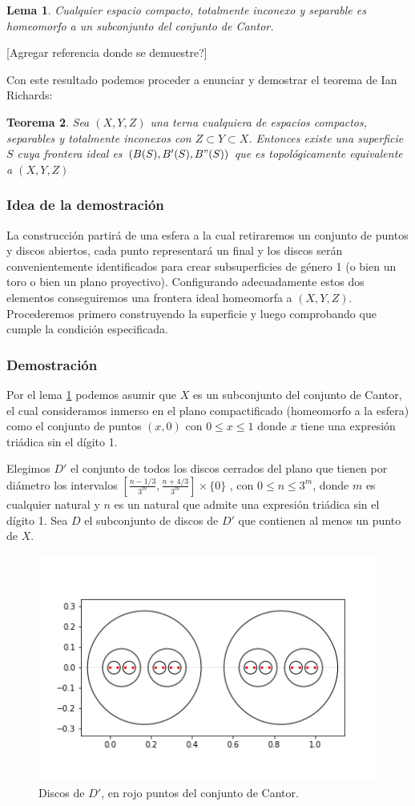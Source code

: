 \documentclass[a4paper,11pt,spanish, twoside, leqno]{tfg-uam}
\newtheorem{teor}{Teorema}[chapter]
\newtheorem{lema}[teor]{Lema}
\theoremstyle{definition}
\begin{document}
\begin{lema}
\label{lema:cantor}
Cualquier espacio compacto, totalmente inconexo y separable es homeomorfo a un subconjunto del conjunto de Cantor.
\end{lema}
[Agregar referencia donde se demuestre?]

Con este resultado podemos proceder a enunciar y demostrar el teorema de Ian Richards:

\begin{teor}
Sea $(X,Y,Z)$ una terna cualquiera de espacios compactos, separables y totalmente inconexos con $Z \subset Y \subset X$.  Entonces existe una superficie $S$ cuya frontera ideal es $(B(S), B'(S), B"(S))$ que es topológicamente equivalente a $(X,Y,Z)$
\end{teor}

\subsubsection*{Idea de la demostración}
La construcción partirá de una esfera a la cual retiraremos un conjunto de puntos y discos abiertos, cada punto representará un final y los discos serán convenientemente identificados para crear  subsuperficies de género 1 (o bien un toro o bien un plano proyectivo). Configurando adecuadamente estos dos elementos conseguiremos una frontera ideal homeomorfa a $(X,Y,Z)$.\\
Procederemos primero construyendo la superficie y luego comprobando que cumple la condición especificada.


\subsubsection*{Demostración}
Por el lema \ref{lema:cantor} podemos asumir que $X$ es un subconjunto del conjunto de Cantor, el cual consideramos inmerso en el plano compactificado (homeomorfo a la esfera) como el conjunto de puntos $(x,0)$ con $0 \leq x\leq 1$ donde $x$ tiene una expresión triádica sin el dígito 1.


Elegimos $D'$ el conjunto de todos los discos cerrados del plano que tienen por diámetro los intervalos $[\frac{n - 1/3}{3^m} , \frac{n + 4/3}{3^m} ] \times \{0\}$ , con $0\leq n \leq 3^m$, donde $m$ es cualquier natural y $n$ es un natural que admite una expresión triádica sin el dígito 1. Sea $D$ el subconjunto de discos de $D'$ que contienen al menos un punto de $X$.\\


\begin{figure}[h!]
	\centering
	\includegraphics[width=0.5\linewidth]{imagenes/conjuntoD.png}
	\caption{Discos de $D'$, en rojo puntos del conjunto de Cantor.}
	\label{fig:conjuntoD}
\end{figure}
\end{document}
